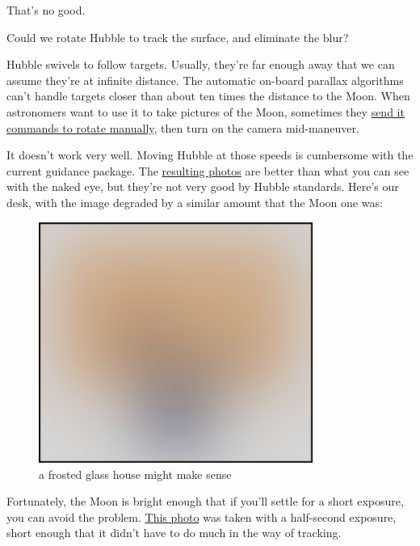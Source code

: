 {That’s no good.}

{Could we rotate Hubble to track the surface, and eliminate the blur?}

{Hubble swivels to follow targets. Usually, they’re far enough away that we can assume they’re at infinite distance. The automatic on-board parallax algorithms can’t handle targets closer than about ten times the distance to the Moon. When astronomers want to use it to take pictures of the Moon, sometimes they \href{http://www.stsci.edu/hst/HST\_overview/documents/uir/UIR-2007-01.pdf}{send it commands to rotate manually}, then turn on the camera mid-maneuver.}

{It doesn’t work very well. Moving Hubble at those speeds is cumbersome with the current guidance package. The \href{http://hubblesite.org/newscenter/archive/releases/1999/14}{resulting photos} are better than what you can see with the naked eye, but they’re not very good by Hubble standards. Here’s our desk, with the image degraded by a similar amount that the Moon one was:}

\begin{figure}[!htbp]
\centering
\includegraphics[scale=0.5, max width=0.8\textwidth]{imgs/a/32/hubble_moon.png}
\caption{a frosted glass house might make sense}
\end{figure}

{Fortunately, the Moon is bright enough that if you’ll settle for a short exposure, you can avoid the problem. \href{http://hubblesite.org/newscenter/archive/releases/2012/22/fastfacts/}{This photo} was taken with a half-second exposure, short enough that it didn’t have to do much in the way of tracking.}

